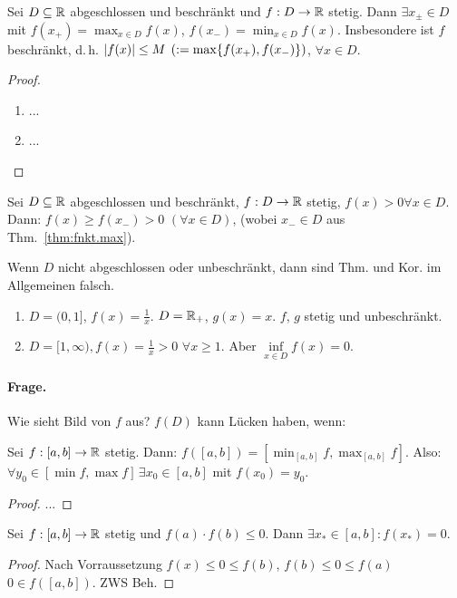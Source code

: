 \documentclass[12pt]{scrreprt}
\begin{document}
\begin{thm}\label{thm:fnkt.max}
Sei $D\subseteq\mathbb{R}$ abgeschlossen und beschränkt und $f: D\rightarrow\mathbb{R}$ stetig. Dann $\exists x_{\pm}\in D$ mit
$f(x_+) = \max_{x\in D} f(x)$, $f(x_-) = \min_{x\in D} f(x)$. Insbesondere ist $f$ beschränkt, d.\,h. 
$\left\lvert f(x)\right\lvert \le M$ $(:= \max\{f(x_+), f(x_-)\})$, $\forall x\in D.$
\end{thm}
\begin{proof}
\begin{enumerate}
\item ... %
\item ...
\end{enumerate}
\end{proof}

\begin{kor}\label{kor:fnkt.max-kor}
Sei $D\subseteq\mathbb{R}$ abgeschlossen und beschränkt, $f: D\rightarrow\mathbb{R}$ stetig, $f(x) > 0 \forall x\in D$.
Dann: $f(x) \ge f(x_-) > 0$ $(\forall x\in D)$, (wobei $x_-\in D$ aus Thm.~\ref{thm:fnkt.max}).
\end{kor}

\begin{bsp*}
Wenn $D$ nicht abgeschlossen oder unbeschränkt, dann sind Thm. und Kor. im Allgemeinen falsch.
\begin{enumerate}
\item $D=(0, 1]$, $f(x) = \frac{1}{x}$. $D=\mathbb{R}_+$, $g(x) = x$. \folgt $f$, $g$ stetig und unbeschränkt.
\item $D = [1, \infty), f(x) = \frac{1}{x} > 0$ $\forall x\ge 1$. Aber $\inf\limits_{x\in D} f(x) = 0$.
\end{enumerate}
\end{bsp*}

\paragraph{Frage.} Wie sieht Bild von $f$ aus? $f(D)$ kann Lücken haben, wenn:

\begin{thm}\label{thm:fnkt.zws}
Sei $f: [a, b] \rightarrow \mathbb{R}$ stetig. Dann: $f([a, b]) = \left[\min_{[a, b]} f, \max_{[a, b]} f\right]$.
Also: $\forall y_0 \in [\min f, \max f]\,\exists x_0\in [a, b]$ mit $f(x_0) = y_0$.
\end{thm}
\begin{proof}
...%
\end{proof}

\begin{kor}[Nullstellensatz]\label{kor:fnkt.nst}
Sei $f:[a,b]\rightarrow\mathbb{R}$ stetig und $f(a)\cdot f(b) \le 0$. Dann $\exists x_*\in [a, b]: f(x_*) = 0$. 
\end{kor}
\begin{proof}
Nach Vorraussetzung $f(x) \le 0 \le f(b)$, $f(b) \le 0 \le f(a)$ \folgt $0\in f([a, b])$. ZWS \folgt Beh.
\end{proof}
\end{document}
